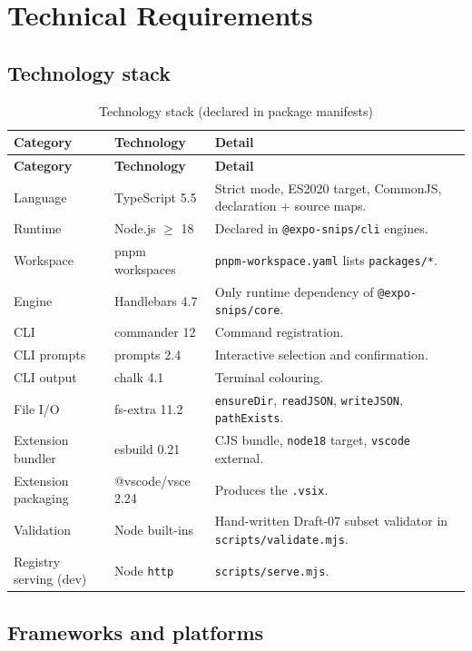 \chapter{Technical Requirements}
\label{ch:technical-requirements}

\section{Technology stack}

\begin{longtable}{@{}L{3.4cm}L{4.4cm}L{6.6cm}@{}}
\caption{Technology stack (declared in package manifests)}\\
\toprule
\textbf{Category} & \textbf{Technology} & \textbf{Detail} \\
\midrule
\endfirsthead
\toprule
\textbf{Category} & \textbf{Technology} & \textbf{Detail} \\
\midrule
\endhead
Language & TypeScript 5.5 & Strict mode, ES2020 target, CommonJS, declaration + source maps. \\
Runtime & Node.js $\geq$ 18 & Declared in \texttt{@expo-snips/cli} engines. \\
Workspace & pnpm workspaces & \texttt{pnpm-workspace.yaml} lists \texttt{packages/*}. \\
Engine & Handlebars 4.7 & Only runtime dependency of \texttt{@expo-snips/core}. \\
CLI & commander 12 & Command registration. \\
CLI prompts & prompts 2.4 & Interactive selection and confirmation. \\
CLI output & chalk 4.1 & Terminal colouring. \\
File I/O & fs-extra 11.2 & \texttt{ensureDir}, \texttt{readJSON}, \texttt{writeJSON}, \texttt{pathExists}. \\
Extension bundler & esbuild 0.21 & CJS bundle, \texttt{node18} target, \texttt{vscode} external. \\
Extension packaging & @vscode/vsce 2.24 & Produces the \texttt{.vsix}. \\
Validation & Node built-ins & Hand-written Draft-07 subset validator in \texttt{scripts/validate.mjs}. \\
Registry serving (dev) & Node \texttt{http} & \texttt{scripts/serve.mjs}. \\
\bottomrule
\end{longtable}

\section{Frameworks and platforms}

